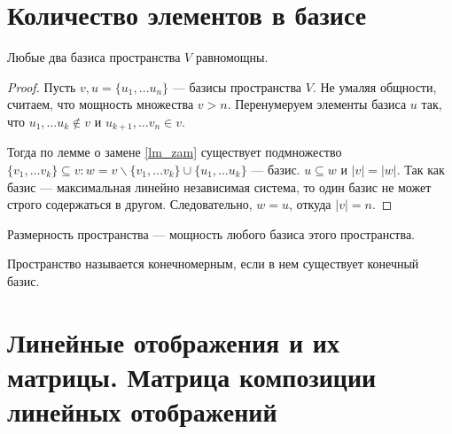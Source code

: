\documentclass[11pt]{book}
\theoremstyle{definition}
\theoremstyle{plain}
\theoremstyle{plain}
\theoremstyle{definition}
\theoremstyle{remark}
\begin{document}
\section{Количество элементов в базисе}
\begin{thm}
    Любые два базиса пространства $ V$ равномощны.
\end{thm}
\begin{proof}
    Пусть $ v, u = \{u_1, \ldots u_n\}$ ---  базисы пространства $ V$. Не умаляя общности, считаем, что мощность множества  $ v > n$. Перенумеруем элементы базиса  $ u$ так, что $ u_1, \ldots u_k \not\in v$ и $ u_{k+1}, \ldots  v_n \in v$.

    Тогда по лемме о замене \ref{lm_zam} существует подмножество $ \{v_1, \ldots v_k\} \subseteq v: w = v \smallsetminus \{v_1, \ldots v_k\} \cup \{u_1, \ldots u_k\}$ --- базис. $ u \subseteq w$ и $ |v|  = |w|$. Так как базис --- максимальная линейно независимая система, то один базис не может строго содержаться в другом. Следовательно, $ w = u$, откуда  $ |v|  = n$.
\end{proof}
\begin{defn}
    {\sf Размерность пространства} --- мощность любого базиса этого пространства.

    Пространство называется {\sf конечномерным}, если в нем существует конечный базис.
\end{defn}
\section{Линейные отображения и их матрицы. Матрица композиции линейных отображений}
\end{document}
